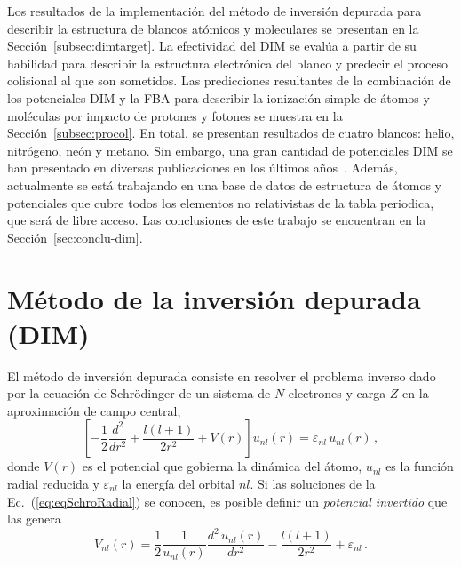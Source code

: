 Los resultados de la implementación del método de inversión depurada 
para describir la estructura de blancos atómicos y moleculares se 
presentan en la Sección~\ref{subsec:dimtarget}. La efectividad del DIM 
se evalúa a partir de su habilidad para describir la estructura 
electrónica del blanco y predecir el proceso colisional al que son 
sometidos. Las predicciones resultantes de la combinación de los 
potenciales DIM y la FBA para describir la ionización simple de átomos y 
moléculas por impacto de protones y fotones se muestra en la 
Sección~\ref{subsec:procol}. En total, se presentan 
resultados de cuatro blancos: helio, nitrógeno, neón y metano. Sin 
embargo, una gran cantidad de potenciales DIM se han presentado en 
diversas publicaciones en los últimos años~\cite{Mendez:16,Mendez:19dim,
Mendez:18}. Además, actualmente se está trabajando en una base de datos 
de estructura de átomos y potenciales que cubre todos los elementos no 
relativistas de la tabla periodica, que será de libre acceso. 
Las conclusiones de este trabajo se encuentran en la 
Sección~\ref{sec:conclu-dim}.

\section{Método de la inversión depurada (DIM)}
\label{sec:dimatomos}

El método de inversión depurada consiste en resolver el problema inverso
dado por la ecuación de Schr\"odinger de un sistema de $N$ electrones y 
carga $Z$ en la aproximación de campo central, 
\begin{equation}
 \left[ -\frac{1}{2}\frac{d^2}{dr^2} + \frac{l(l+1)}{2r^2} +
 V(r) \right] u_{nl}(r) = \varepsilon_{nl} \, u_{nl}(r)\,,
\label{eq:eqSchroRadial}
\end{equation}
donde $V(r)$ es el potencial que gobierna la dinámica del átomo, 
$u_{nl}$ es la función radial reducida y $\varepsilon_{nl}$ la energía
del orbital $nl$. Si las soluciones de la Ec.~(\ref{eq:eqSchroRadial}) 
se conocen, es posible definir un \textit{potencial invertido} que las 
genera
\begin{equation}
V_{nl}(r) = 
\frac{1}{2}\frac{1}{u_{nl}(r)} \frac{d^2\,u_{nl}(r)}{dr^{2}} - 
\frac{l(l+1)}{2r^{2}}+\varepsilon_{nl} \,.
\label{eq:Vinv}
\end{equation}

